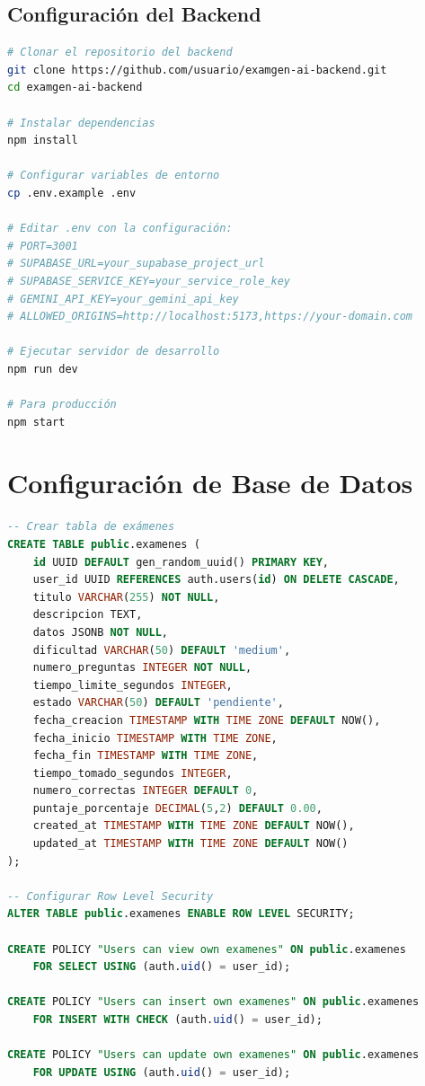 \documentclass[12pt,a4paper]{report}
\begin{document}
\subsection{Configuración del Backend}

\begin{lstlisting}[language=bash, caption=Instalación y configuración del backend]
# Clonar el repositorio del backend
git clone https://github.com/usuario/examgen-ai-backend.git
cd examgen-ai-backend

# Instalar dependencias
npm install

# Configurar variables de entorno
cp .env.example .env

# Editar .env con la configuración:
# PORT=3001
# SUPABASE_URL=your_supabase_project_url
# SUPABASE_SERVICE_KEY=your_service_role_key
# GEMINI_API_KEY=your_gemini_api_key
# ALLOWED_ORIGINS=http://localhost:5173,https://your-domain.com

# Ejecutar servidor de desarrollo
npm run dev

# Para producción
npm start
\end{lstlisting}

\section{Configuración de Base de Datos}

\begin{lstlisting}[language=sql, caption=Script de creación de tablas principales]
-- Crear tabla de exámenes
CREATE TABLE public.examenes (
    id UUID DEFAULT gen_random_uuid() PRIMARY KEY,
    user_id UUID REFERENCES auth.users(id) ON DELETE CASCADE,
    titulo VARCHAR(255) NOT NULL,
    descripcion TEXT,
    datos JSONB NOT NULL,
    dificultad VARCHAR(50) DEFAULT 'medium',
    numero_preguntas INTEGER NOT NULL,
    tiempo_limite_segundos INTEGER,
    estado VARCHAR(50) DEFAULT 'pendiente',
    fecha_creacion TIMESTAMP WITH TIME ZONE DEFAULT NOW(),
    fecha_inicio TIMESTAMP WITH TIME ZONE,
    fecha_fin TIMESTAMP WITH TIME ZONE,
    tiempo_tomado_segundos INTEGER,
    numero_correctas INTEGER DEFAULT 0,
    puntaje_porcentaje DECIMAL(5,2) DEFAULT 0.00,
    created_at TIMESTAMP WITH TIME ZONE DEFAULT NOW(),
    updated_at TIMESTAMP WITH TIME ZONE DEFAULT NOW()
);

-- Configurar Row Level Security
ALTER TABLE public.examenes ENABLE ROW LEVEL SECURITY;

CREATE POLICY "Users can view own examenes" ON public.examenes
    FOR SELECT USING (auth.uid() = user_id);

CREATE POLICY "Users can insert own examenes" ON public.examenes
    FOR INSERT WITH CHECK (auth.uid() = user_id);

CREATE POLICY "Users can update own examenes" ON public.examenes
    FOR UPDATE USING (auth.uid() = user_id);
\end{lstlisting}
\end{document}
